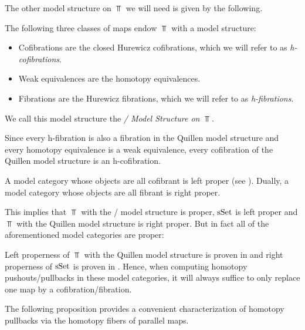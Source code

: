 The other model structure on $\Top$ we will need is given by the following.
\begin{thm}\label{thm:stromModelStructure}
    The following three classes of maps endow $\Top$ with a model structure:
    \begin{itemize}
        \item Cofibrations are the closed Hurewicz cofibrations, which we will refer to as \emph{h-cofibrations}.
        \item Weak equivalences are the homotopy equivalences.
        \item Fibrations are the Hurewicz fibrations, which we will refer to as \emph{h-fibrations}.
    \end{itemize}
    We call this model structure the \emph{\Strom/ Model Structure on $\Top$}.
    \begin{reference}
       \cite{Strom1972}%
    \end{reference}
\end{thm}
\begin{remark}
    Since every h-fibration is also a fibration in the Quillen model structure and every homotopy equivalence is a weak equivalence, every cofibration of the Quillen model structure is an h-cofibration. %
\end{remark}
\begin{remark}[Properness] 
    A model category whose objects are all cofibrant is left proper (see \cite[Proposition A.2.4.2]{HTT}).
    Dually, a model category whose objects are all fibrant is right proper.
    
    This implies that $\Top$ with the \Strom/ model structure is proper, $\operatorname{sSet}$ is left proper and $\Top$ with the Quillen model structure is right proper.
    But in fact all of the aforementioned model categories are proper:

    Left properness of $\Top$ with the Quillen model structure is proven in \cite[Theorem 13.1.10]{hirschhorn2003model} and right properness of $\operatorname{sSet}$ is proven in \cite[Theorem 13.1.13]{hirschhorn2003model}.
    Hence, when computing homotopy pushouts/pullbacks in these model categories, it will always suffice to only replace one map by a cofibration/fibration.
\end{remark}
The following proposition provides a convenient characterization of homotopy pullbacks via the homotopy fibers of parallel maps.
